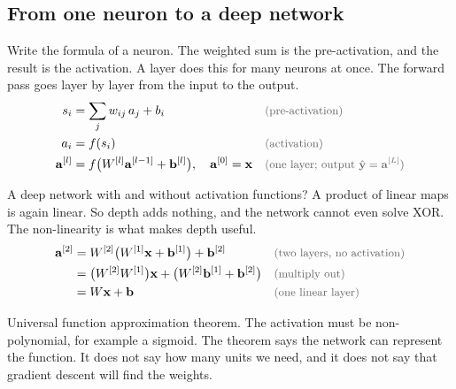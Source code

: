 \subsection{From one neuron to a deep network}

\begin{qabox}{Write the formula of a neuron.}
\explain The weighted sum is the pre-activation, and the result is the activation. A layer does
this for many neurons at once. The forward pass goes layer by layer from the input to the output.
\derive
\begin{align*}
s_i &= \sum_j w_{ij}\,a_j + b_i \why{pre-activation} \\
a_i &= f(s_i) \why{activation} \\
\mathbf{a}^{[l]} &= f\bigl(W^{[l]}\mathbf{a}^{[l-1]} + \mathbf{b}^{[l]}\bigr),\quad \mathbf{a}^{[0]} = \mathbf{x} \why{one layer; output $\hat{\mathbf{y}} = \mathbf{a}^{[L]}$}
\end{align*}
\end{qabox}

\begin{qabox}{A deep network with and without activation functions?}
\explain A product of linear maps is again linear. So depth adds nothing, and the network cannot
even solve XOR. The non-linearity is what makes depth useful.
\derive
\begin{align*}
\mathbf{a}^{[2]} &= W^{[2]}\bigl(W^{[1]}\mathbf{x} + \mathbf{b}^{[1]}\bigr) + \mathbf{b}^{[2]} \why{two layers, no activation} \\
&= \bigl(W^{[2]}W^{[1]}\bigr)\mathbf{x} + \bigl(W^{[2]}\mathbf{b}^{[1]} + \mathbf{b}^{[2]}\bigr) \why{multiply out} \\
&= W\mathbf{x} + \mathbf{b} \why{one linear layer}
\end{align*}
\end{qabox}

\begin{qabox}{Universal function approximation theorem.}
\explain The activation must be non-polynomial, for example a sigmoid. The theorem says the network
can represent the function. It does not say how many units we need, and it does not say that
gradient descent will find the weights.
\end{qabox}

